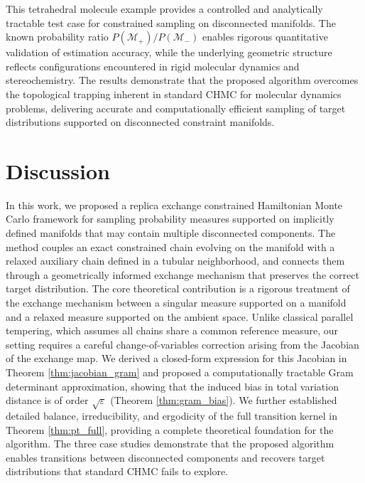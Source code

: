 \documentclass[12pt]{article}
\begin{document}
 This tetrahedral molecule example provides a controlled and analytically tractable test case for constrained sampling on disconnected manifolds. The known probability ratio $P(\mathcal{M}_+)/P(\mathcal{M}_-)$ enables rigorous quantitative validation of estimation accuracy, while the underlying geometric structure reflects configurations encountered in rigid molecular dynamics and stereochemistry. The results demonstrate that the proposed algorithm overcomes the topological trapping inherent in standard CHMC for molecular dynamics problems, delivering accurate and computationally efficient sampling of target distributions supported on disconnected constraint manifolds.


\section{Discussion}\label{sec6}
In this work, we proposed a replica exchange constrained Hamiltonian Monte Carlo framework for sampling probability measures supported on implicitly defined manifolds that may contain multiple disconnected components. The method couples an exact constrained chain evolving on the manifold with a relaxed auxiliary chain defined in a tubular neighborhood, and connects them through a geometrically informed exchange mechanism that preserves the correct target distribution.
The core theoretical contribution is a rigorous treatment of the exchange mechanism between a singular measure supported on a manifold and a relaxed measure supported on the ambient space. Unlike classical parallel tempering, which assumes all chains share a common reference measure, our setting requires a careful change-of-variables correction arising from the Jacobian of the exchange map. We derived a closed-form expression for this Jacobian in Theorem \ref{thm:jacobian_gram} and proposed a computationally tractable Gram determinant approximation, showing that the induced bias in total variation distance is of order $\sqrt{\varepsilon}$ (Theorem \ref{thm:gram_bias}). We further established detailed balance, irreducibility, and ergodicity of the full transition kernel in Theorem \ref{thm:pt_full}, providing a complete theoretical foundation for the algorithm. The three case studies demonstrate that the proposed algorithm enables transitions between disconnected components and recovers target distributions that standard CHMC fails to explore.
\end{document}
